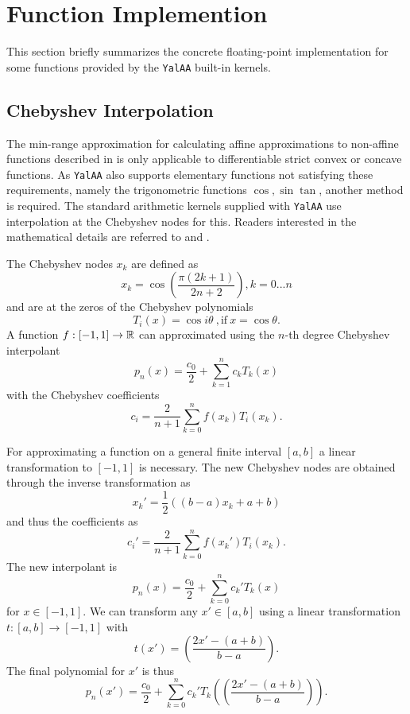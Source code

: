 \documentclass[a4]{scrartcl}
\newcommand{\iv}[2]{\ensuremath{[#1, #2]}\xspace}
\newcommand{\yalaa}{\texttt{YalAA}\xspace}
\begin{document}
\appendix

\section{Function Implemention}
\label{sec:funct-impl}
This section briefly summarizes the concrete floating-point implementation for
some functions provided by the \yalaa built-in kernels.
\subsection{Chebyshev Interpolation}
\label{sec:chebysh-interp}
The min-range approximation for calculating affine approximations to
non-affine functions described in \cite{stolfi1997} is only applicable to
differentiable strict convex or concave functions. As \yalaa also supports
elementary functions not satisfying these requirements, namely the
trigonometric functions $\cos, \sin \tan$, another method is required. The
standard arithmetic kernels supplied with \yalaa use interpolation at the
Chebyshev nodes for this. Readers interested in the mathematical details
are referred to \cite{kearfott2010} and \cite{mason2003}.

The Chebyshev nodes $x_k$ are defined as
\[
x_k = \cos \left ( \frac{\pi (2k+1)}{2n+2} \right ), k=0...n
\]
and are at the zeros of the Chebyshev polynomials
\[
T_i(x) = \cos i \theta \mathrm{\ ,if\ } x = \cos \theta .
\]
A function $f: \iv{-1}{1} \rightarrow \Rz$ can approximated using the $n$-th degree
Chebyshev interpolant
\[
p_n(x) = \frac{ c_0}{ 2} + \sum \limits_{k=1}^n c_kT_k(x)
\]
with the Chebyshev coefficients
\[
c_i = \frac{2}{n+1} \sum \limits_{k=0}^n f(x_k)T_i(x_k) .
\]

For approximating a function on a general finite interval $\iv{a}{b}$ a linear
transformation to $\iv{-1}{1}$ is necessary. The new Chebyshev nodes
are obtained through the inverse transformation as
\[
x_k' = \frac{1}{2}\left ( (b-a)x_k + a + b \right )
\]
and thus the coefficients as
\[
c_i' = \frac{2}{n+1} \sum \limits_{k=0}^n f(x_k')T_i(x_k) .
\]
The new interpolant is 
\[
p_n(x) = \frac{c_0}{2} + \sum \limits_{k=0}^n c_k' T_k(x) 
\]
for $x \in \iv{-1}{1}$. We can transform any $x' \in \iv{a}{b}$ using a
linear transformation $t: \iv{a}{b} \rightarrow \iv{-1}{1}$ with
\[
t(x') = \left ( \frac{2x' - (a+b)}{b-a}\right) .
\]
The final polynomial for $x'$ is thus
\[
p_n(x') = \frac{c_0}{2} + \sum \limits_{k=0}^n c_k' T_k(\left ( \frac{2x' - (a+b)}{b-a}\right)) .
\]
\end{document}
